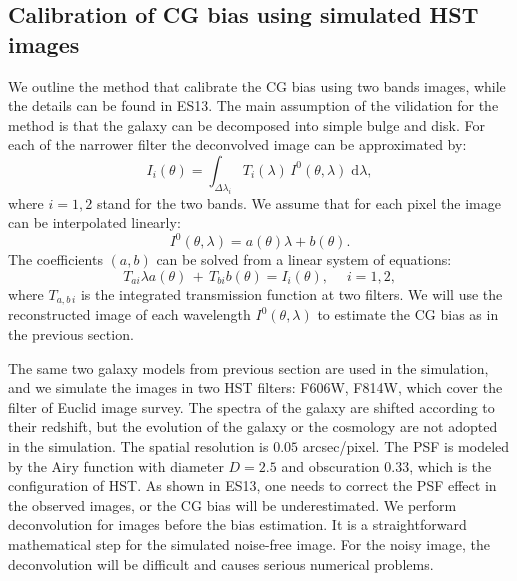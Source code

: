 \documentclass[useAMS,usenatbib]{mn2e}
\renewcommand{\d}{\mathrm{d}}
\newcommand{\be}{\begin{equation}}
\newcommand{\ee}{\end{equation}}
\def\elabel#1{\label{eq:#1}}
\begin{document}
\subsection{Calibration of CG bias using simulated HST images}

We outline the method that calibrate the CG bias using two bands
images, while the details can be found in ES13. The main assumption of
the vilidation for the method is that the galaxy can be decomposed
into simple bulge and disk. For each of the narrower filter the
deconvolved image can be approximated by:
%
\be
I_i(\theta) = \int_{\Delta \lambda_i} T_i(\lambda)\, I^0(\theta,\lambda) \;\d \lambda,
\elabel{linearitp}
\ee
%
where $i=1,2$ stand for the two bands.
We assume that for each pixel the image can be interpolated linearly:
%
\be
I^0(\theta,\lambda)=a(\theta)\lambda + b(\theta).
\ee
%
The coefficients $(a,b)$ can be solved from a linear system of equations:
%
\be
T_{ai} \lambda a(\theta) \,+\,T_{bi} b(\theta) = I_i(\theta), \quad\; i=1,2,
\elabel{lineareq}
\ee
%
where $T_{a,b\,i}$ is the integrated transmission function at two
filters. We will use the reconstructed image of each wavelength
$I^0(\theta,\lambda)$ to estimate the CG bias as in the previous section.

The same two galaxy models from previous section are used in the
simulation, and we simulate the images in two HST filters: F606W,
F814W, which cover the filter of Euclid image survey. The spectra of
the galaxy are shifted according to their redshift, but the evolution
of the galaxy or the cosmology are not adopted in the simulation. The
spatial resolution is $0.05$ arcsec/pixel. The PSF is modeled by the
Airy function with diameter $D=2.5$ and obscuration $0.33$,
which is the configuration of HST. As shown in ES13, one needs to
correct the PSF effect in the observed images, or the CG bias will be
underestimated. We perform deconvolution for images before the bias
estimation. It is a straightforward mathematical step for the
simulated noise-free image. For the noisy image, the deconvolution
will be difficult and causes serious numerical problems.
\end{document}
